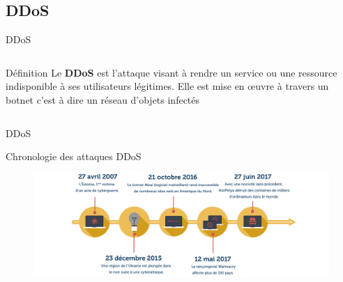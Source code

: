 \documentclass[aspectratio=169,professionalfonts, 12pt]{beamer}
\begin{document}
\subsection{DDoS}
\begin{frame}{DDoS}
\begin{columns}
	\begin{column}{0.4\textwidth}
	      		{\begin{block}{Définition}
 Le \textbf{DDoS} est l'attaque visant à rendre un service ou une ressource indisponible à ses utilisateurs légitimes. Elle est mise en œuvre à travers un botnet c'est à dire un réseau d'objets infectés
	\end{block}
      		  }
	     \end{column}
     \begin{column}{0.6\textwidth}
      \end{column}
      	\end{columns}	
\end{frame}
\begin{frame}{DDoS}
	
	\begin{block}{Chronologie des attaques DDoS}
	\begin{figure}[t]
	      \centering
	      \includegraphics[height=0.6\textheight, width=\textwidth]{images/cybermenace-avis-de-tempete-attaquants-chronologie_1}
	    \end{figure} 
	\end{block}
			
		\end{frame}
\end{document}
